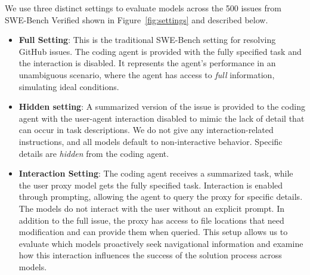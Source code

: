 We use three distinct settings to evaluate models across the 500 issues from SWE-Bench Verified shown in Figure~\ref{fig:settings} and described below.
\begin{itemize}

    \item \textbf{Full Setting}: This is the traditional SWE-Bench setting for resolving GitHub issues. The coding agent is provided with the fully specified task and the interaction is disabled. It represents the agent's performance in an unambiguous scenario, where the agent has access to \textit{full} information, simulating ideal conditions.
    \item \textbf{Hidden setting}: A summarized version of the issue is provided to the coding agent with the user-agent interaction disabled to mimic the lack of detail that can occur in task descriptions. We do not give any interaction-related instructions, and all models default to non-interactive behavior. Specific details are \textit{hidden} from the coding agent.
    \item \textbf{Interaction Setting}: The coding agent receives a summarized task, while the user proxy model gets the fully specified task. Interaction is enabled through prompting, allowing the agent to query the proxy for specific details. The models do not interact with the user without an explicit prompt. In addition to the full issue, the proxy has access to file locations that need modification and can provide them when queried. This setup allows us to evaluate which models proactively seek navigational information and examine how this interaction influences the success of the solution process across models.
\end{itemize}


